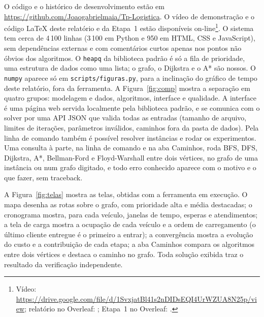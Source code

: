 \documentclass[12pt]{article}
\begin{document}
O código e o histórico de desenvolvimento estão em \url{https://github.com/Joaogabrielmaia/Tp-Logistica}. O vídeo de demonstração e o código LaTeX deste relatório e da Etapa~1 estão disponíveis on-line\footnote{Vídeo: \url{https://drive.google.com/file/d/1SvxjatBl41s2nDIDsEQI4UrWZUA8N25p/view}; relatório no Overleaf: \linkrelatorio; Etapa~1 no Overleaf: \linketapa.}. O sistema tem cerca de 4\,100 linhas (3\,100 em Python e 950 em HTML, CSS e JavaScript), sem dependências externas e com comentários curtos apenas nos pontos não óbvios dos algoritmos. O \texttt{heapq} da biblioteca padrão é só a fila de prioridade, uma estrutura de dados como uma lista; o grafo, o Dijkstra e o A* são nossos. O \texttt{numpy} aparece só em \texttt{scripts/figuras.py}, para a inclinação do gráfico de tempo deste relatório, fora da ferramenta. A Figura~\ref{fig:comp} mostra a separação em quatro grupos: modelagem e dados, algoritmos, interface e qualidade. A interface é uma página web servida localmente pela biblioteca padrão, e se comunica com o solver por uma API JSON que valida todas as entradas (tamanho de arquivo, limites de iterações, parâmetros inválidos, caminhos fora da pasta de dados). Pela linha de comando também é possível resolver instâncias e rodar os experimentos. Uma consulta à parte, na linha de comando e na aba Caminhos, roda BFS, DFS, Dijkstra, A*, Bellman-Ford e Floyd-Warshall entre dois vértices, no grafo de uma instância ou num grafo digitado, e todo erro conhecido aparece com o motivo e o que fazer, sem traceback.

A Figura~\ref{fig:telas} mostra as telas, obtidas com a ferramenta em execução. O mapa desenha as rotas sobre o grafo, com prioridade alta e média destacadas; o cronograma mostra, para cada veículo, janelas de tempo, esperas e atendimentos; a tela de carga mostra a ocupação de cada veículo e a ordem de carregamento (o último cliente entregue é o primeiro a entrar); a convergência mostra a evolução do custo e a contribuição de cada etapa; a aba Caminhos compara os algoritmos entre dois vértices e destaca o caminho no grafo. Toda solução exibida traz o resultado da verificação independente.
\end{document}

